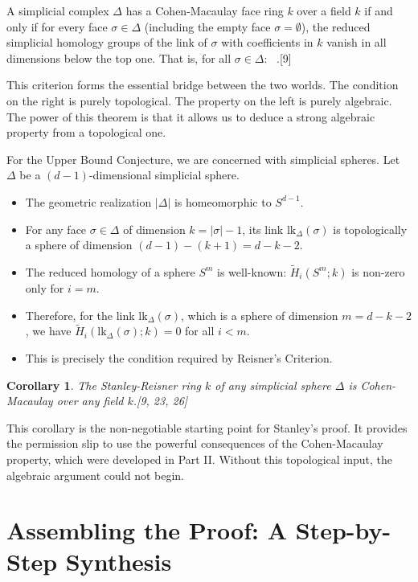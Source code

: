 \documentclass[11pt]{article}
\begin{document}
\begin{theorem}
A simplicial complex $\Delta$ has a Cohen-Macaulay face ring $k$ over a field $k$ if and only if for every face $\sigma \in \Delta$ (including the empty face $\sigma = \emptyset$), the reduced simplicial homology groups of the link of $\sigma$ with coefficients in $k$ vanish in all dimensions below the top one. That is, for all $\sigma \in \Delta$:
\
.[9]
\end{theorem}

This criterion forms the essential bridge between the two worlds. The condition on the right is purely topological. The property on the left is purely algebraic. The power of this theorem is that it allows us to deduce a strong algebraic property from a topological one.

For the Upper Bound Conjecture, we are concerned with simplicial spheres. Let $\Delta$ be a $(d-1)$-dimensional simplicial sphere.
\begin{itemize}
    \item The geometric realization $|\Delta|$ is homeomorphic to $S^{d-1}$.
    \item For any face $\sigma \in \Delta$ of dimension $k = |\sigma|-1$, its link $\text{lk}_\Delta(\sigma)$ is topologically a sphere of dimension $(d-1)-(k+1) = d-k-2$.
    \item The reduced homology of a sphere $S^m$ is well-known: $\tilde{H}_i(S^m; k)$ is non-zero only for $i=m$.
    \item Therefore, for the link $\text{lk}_\Delta(\sigma)$, which is a sphere of dimension $m = d-k-2$, we have $\tilde{H}_i(\text{lk}_\Delta(\sigma); k) = 0$ for all $i < m$.
    \item This is precisely the condition required by Reisner's Criterion.
\end{itemize}

\newtheorem{corollary}{Corollary}
\begin{corollary}
The Stanley-Reisner ring $k$ of any simplicial sphere $\Delta$ is Cohen-Macaulay over any field $k$.[9, 23, 26]
\end{corollary}

This corollary is the non-negotiable starting point for Stanley's proof. It provides the permission slip to use the powerful consequences of the Cohen-Macaulay property, which were developed in Part II. Without this topological input, the algebraic argument could not begin.

\section{Assembling the Proof: A Step-by-Step Synthesis}
\end{document}
